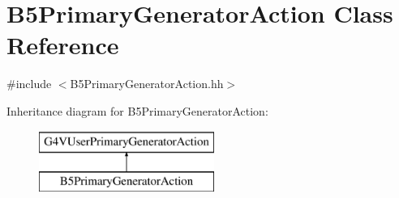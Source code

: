 \hypertarget{class_b5_primary_generator_action}{}\section{B5\+Primary\+Generator\+Action Class Reference}
\label{class_b5_primary_generator_action}


{\ttfamily \#include $<$B5\+Primary\+Generator\+Action.\+hh$>$}

Inheritance diagram for B5\+Primary\+Generator\+Action\+:\begin{figure}[H]
\begin{center}
\leavevmode
\includegraphics[height=2.000000cm]{class_b5_primary_generator_action}
\end{center}
\end{figure}
